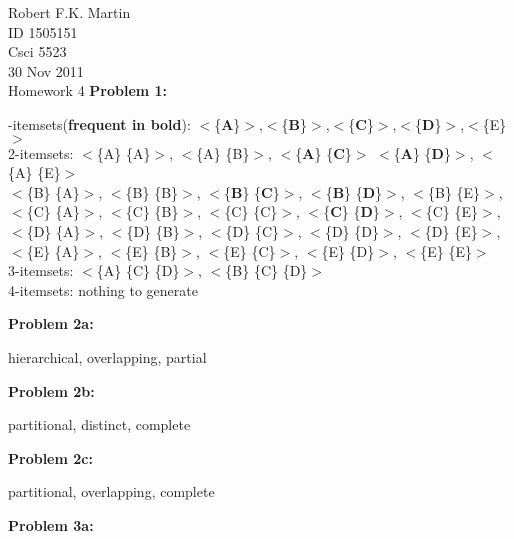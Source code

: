 \documentclass[11pt]{article}
\numberwithin{equation}{section}  %
\begin{document}


\noindent Robert F.K. Martin\\
ID 1505151\\
Csci 5523\\
30 Nov 2011\\
Homework 4
\hline
\vspace*{0.25in}
\noindent\textbf{Problem 1: }

-itemsets(\textbf{frequent in bold}): $<$\{\textbf{A}\}$>$,$<$\{\textbf{B}\}$>$,$<$\{\textbf{C}\}$>$,$<$\{\textbf{D}\}$>$,$<$\{E\}$>$\\
2-itemsets: $<$\{A\} \{A\}$>$, $<$\{A\} \{B\}$>$, $<$\{\textbf{A}\} \{\textbf{C}\}$>$ $<$\{\textbf{A}\} \{\textbf{D}\}$>$, $<$\{A\} \{E\}$>$\\
$<$\{B\} \{A\}$>$, $<$\{B\} \{B\}$>$, $<$\{\textbf{B}\} \{\textbf{C}\}$>$, $<$\{\textbf{B}\} \{\textbf{D}\}$>$, $<$\{B\} \{E\}$>$,\\
$<$\{C\} \{A\}$>$, $<$\{C\} \{B\}$>$, $<$\{C\} \{C\}$>$, $<$\{\textbf{C}\} \{\textbf{D}\}$>$, $<$\{C\} \{E\}$>$,\\
$<$\{D\} \{A\}$>$, $<$\{D\} \{B\}$>$, $<$\{D\} \{C\}$>$, $<$\{D\} \{D\}$>$, $<$\{D\} \{E\}$>$,\\
$<$\{E\} \{A\}$>$, $<$\{E\} \{B\}$>$, $<$\{E\} \{C\}$>$, $<$\{E\} \{D\}$>$, $<$\{E\} \{E\}$>$\\
3-itemsets: $<$\{A\} \{C\} \{D\}$>$, $<$\{B\} \{C\} \{D\}$>$\\
4-itemsets: nothing to generate

\vspace*{0.25in}
\noindent\textbf{Problem 2a: }

\noindent hierarchical, overlapping, partial

\vspace*{0.25in}
\noindent\textbf{Problem 2b: }

\noindent partitional, distinct, complete

\vspace*{0.25in}
\noindent\textbf{Problem 2c: }

\noindent partitional, overlapping, complete

\vspace*{0.25in}
\noindent\textbf{Problem 3a: }
\end{document}
